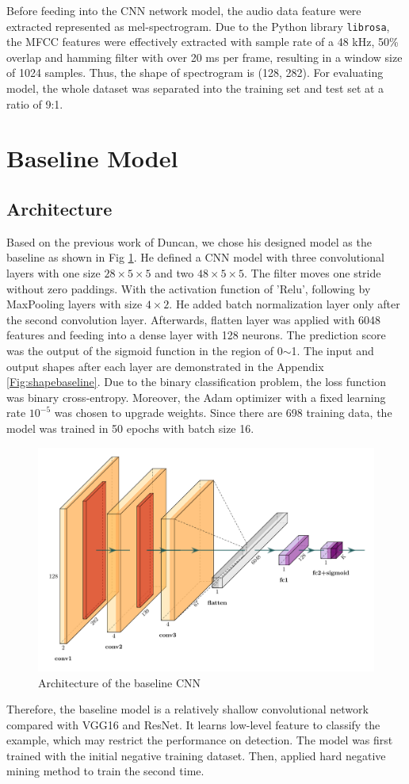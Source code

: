 Before feeding into the CNN network model, the audio data feature were extracted represented as mel-spectrogram. Due to the Python library \texttt{librosa}, the MFCC features were effectively extracted with sample rate of a 48 kHz, 50\% overlap and hamming filter with over 20 ms per frame, resulting in a window size of 1024 samples. Thus, the shape of spectrogram is (128, 282). For evaluating model, the whole dataset was separated into the training set and test set at a ratio of 9:1. 

\section{Baseline Model}
\subsection{Architecture}
Based on the previous work of Duncan, we chose his designed model as the baseline as shown in Fig \ref{fig:baseline}. He defined a CNN model with three convolutional layers with one size $28\times5\times5$ and two $48\times5\times5$. The filter moves one stride without zero paddings. With the activation function of 'Relu', following by MaxPooling layers with size $4\times2$. He added batch normalization layer only after the second convolution layer. Afterwards, flatten layer was applied with 6048 features and feeding into a dense layer with 128 neurons. The prediction score was the output of the sigmoid function in the region of 0$\sim$1. The input and output shapes after each layer are demonstrated in the Appendix \ref{Fig:shapebaseline}. Due to the binary classification problem, the loss function was binary cross-entropy. Moreover, the Adam optimizer with a fixed learning rate $10^{-5}$ was chosen to upgrade weights. Since there are 698 training data, the model was trained in 50 epochs with batch size 16. \par
\begin{figure}[htp]
\centering
\includegraphics[scale=0.55]{Figs/chap4/baseline.pdf}
\caption{Architecture of the baseline CNN}
\label{fig:baseline}
\end{figure}
Therefore, the baseline model is a relatively shallow convolutional network compared with VGG16 and ResNet. It learns low-level feature to classify the example, which may restrict the performance on detection. The model was first trained with the initial negative training dataset. Then, applied hard negative mining method to train the second time.
